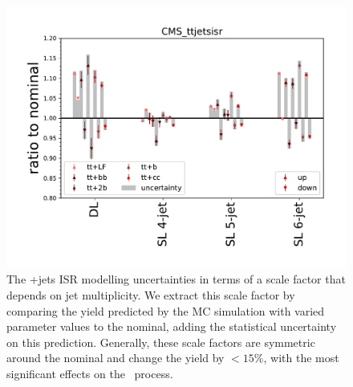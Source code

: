 \begin{figure}
\begin{centering}
\includegraphics[width=1.0\textwidth]{figures/tth/CMS_ttjetsisr.pdf}
\caption[The \ttbar+jets ISR modelling uncertainties]{The \ttbar+jets ISR modelling uncertainties in terms of a scale factor that depends on jet multiplicity. We extract this scale factor by comparing the yield predicted by the MC simulation with varied parameter values to the nominal, adding the statistical uncertainty on this prediction. Generally, these scale factors are symmetric around the nominal and change the yield by $<15\%$, with the most significant effects on the \ttlf~process.}
\label{fig:tth_ttjets_modelling}
\end{centering}
\end{figure}

